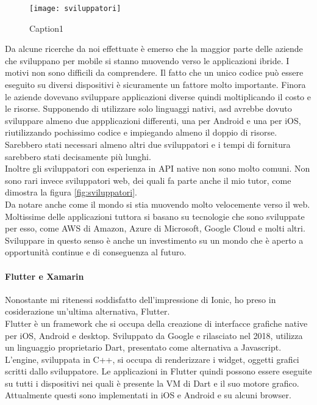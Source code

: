 \begin{wrapfigure}{l}{0.45\textwidth}
  \texttt{[image: sviluppatori]} 
  \caption{Caption1}
  \label{fig:sviluppatori}
\end{wrapfigure}

Da alcune ricerche da noi effettuate è emerso che la maggior parte delle aziende che sviluppano per mobile si stanno muovendo verso le
applicazioni ibride. I motivi non sono difficili da comprendere. Il fatto che un unico codice può essere eseguito su diversi dispositivi è
sicuramente un fattore molto importante. Finora le aziende dovevano sviluppare applicazioni diverse quindi moltiplicando il costo e le
risorse. Supponendo di utilizzare solo linguaggi nativi, \acrlong{asd} avrebbe dovuto sviluppare almeno due appplicazioni differenti, una
per Android e una per iOS, riutilizzando pochissimo codice e impiegando almeno il doppio di risorse. Sarebbero stati necessari almeno altri
due sviluppatori e i tempi di fornitura sarebbero stati decisamente più lunghi. \\
Inoltre gli sviluppatori con esperienza in API native non sono molto comuni. Non sono rari invece sviluppatori web, dei quali fa parte anche il mio
tutor, come dimostra la figura \autoref{fig:sviluppatori}. \\
Da notare anche come il mondo si stia muovendo molto velocemente verso il web. Moltissime delle applicazioni tuttora si basano su tecnologie
che sono sviluppate per esso, come AWS di Amazon, Azure di Microsoft, Google Cloud e molti altri. Sviluppare in questo senso è
anche un investimento su un mondo che è aperto a opportunità continue e di conseguenza al futuro.

\paragraph{Flutter e Xamarin}
Nonostante mi ritenessi soddisfatto dell'impressione di Ionic, ho preso in cosiderazione un'ultima alternativa, Flutter. \\
Flutter è un framework che si occupa della creazione di interfacce grafiche native per iOS, Android e desktop. Sviluppato da Google e
rilasciato nel 2018, utilizza un linguaggio proprietario Dart, presentato come alternativa a Javascript. L'engine, sviluppata in
\gls{C++}, si occupa di renderizzare i widget, oggetti grafici scritti dallo sviluppatore. Le applicazioni in Flutter quindi possono essere
eseguite su tutti i dispositivi nei quali è presente la VM di Dart e il suo motore grafico. Attualmente questi sono implementati in iOS e
Android e su alcuni browser. \\

